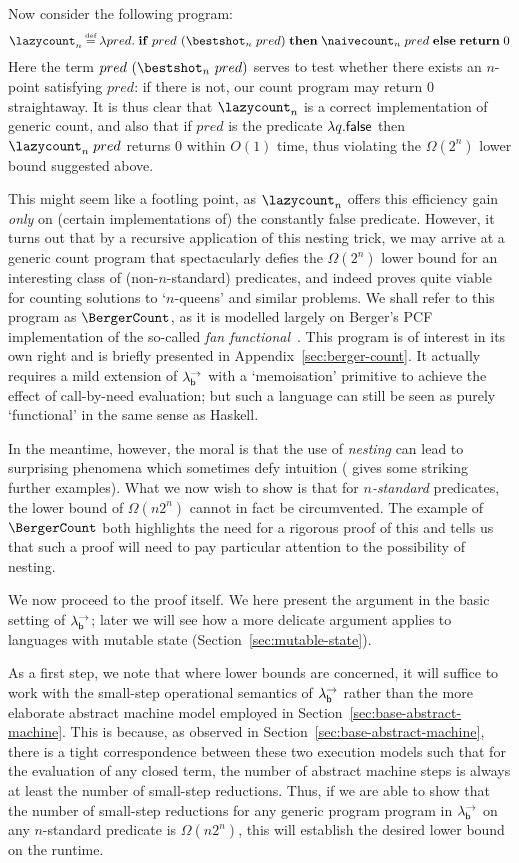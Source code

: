 \documentclass[12pt,phd,lfcs,twoside,openright,logo,leftchapter,normalheadings]{infthesis}
\theoremstyle{plain}
\theoremstyle{definition}
\begin{document}
Now consider the following program:
%
{
\[
  \lazycount_n \defas \lambda pred.\; \If \; pred~(\bestshot_n\;pred)\; \Then\; \naivecount_n\;pred\; \Else\; \Return\;0
\]}%
%
Here the term $pred~(\bestshot_n~pred)$ serves to test whether there
exists an $n$-point satisfying $pred$: if there is not, our count
program may return $0$ straightaway.  It is thus clear that
$\lazycount_n$ is a correct implementation of generic count, and also
that if $pred$ is the predicate $\lambda q.\mathsf{false}$ then
$\lazycount_n\;pred$ returns $0$ within $O(1)$ time, thus violating
the $\Omega(2^n)$ lower bound suggested above.

This might seem like a footling point, as $\lazycount_n$ offers this
efficiency gain \emph{only} on (certain implementations of) the
constantly false predicate.  However, it turns out that by a recursive
application of this nesting trick, we may arrive at a generic count
program that spectacularly defies the $\Omega(2^n)$ lower bound for an
interesting class of (non-$n$-standard) predicates, and indeed proves
quite viable for counting solutions to `$n$-queens' and similar
problems.  We shall refer to this program as $\BergerCount$, as it is
modelled largely on Berger's PCF implementation of the so-called
\emph{fan functional}~\citep{Berger90, LongleyN15}. This program is of
interest in its own right and is briefly presented in
Appendix~\ref{sec:berger-count}. It actually requires a mild
extension of $\lambda^\rightarrow_{\mathsf{b}}$ with a `memoisation' primitive to achieve the
effect of call-by-need evaluation; but such a language can still be
seen as purely `functional' in the same sense as Haskell.

In the meantime, however, the moral is that the use of \emph{nesting}
can lead to surprising phenomena which sometimes defy intuition
(\citet{Escardo07} gives some striking further examples). What we now
wish to show is that for \emph{$n$-standard} predicates, the \naive
lower bound of $\Omega(n2^n)$ cannot in fact be circumvented. The
example of $\BergerCount$ both highlights the need for a rigorous
proof of this and tells us that such a proof will need to pay
particular attention to the possibility of nesting.

We now proceed to the proof itself. We here present the argument in
the basic setting of $\lambda^\rightarrow_{\mathsf{b}}$; later we will see how a more delicate
argument applies to languages with mutable state
(Section~\ref{sec:mutable-state}).

As a first step, we note that where lower bounds are concerned, it
will suffice to work with the small-step operational semantics of
$\lambda^\rightarrow_{\mathsf{b}}$ rather than the more elaborate abstract machine model
employed in Section~\ref{sec:base-abstract-machine}. This is because,
as observed in Section~\ref{sec:base-abstract-machine}, there is a
tight correspondence between these two execution models such that for
the evaluation of any closed term, the number of abstract machine
steps is always at least the number of small-step reductions.  Thus,
if we are able to show that the number of small-step reductions for
any generic program program in $\lambda^\rightarrow_{\mathsf{b}}$ on any $n$-standard predicate
is $\Omega(n2^n)$, this will establish the desired lower bound on the
runtime.
\end{document}
